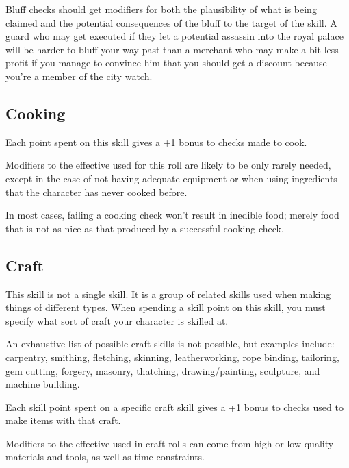 \begin{multicols*}{2}
Bluff checks should get modifiers for both the plausibility of what is being claimed and the potential consequences of the bluff to the target of the skill. A guard who may get executed if they let a potential assassin into the royal palace will be harder to bluff your way past than a merchant who may make a bit less profit if you manage to convince him that you should get a discount because you’re a member of the city watch.


\subsection{Cooking}\label{skill:Cooking}
Each point spent on this skill gives a +1 bonus to  checks made to cook.

Modifiers to the effective  used for this roll are likely to be only rarely needed, except in the case of not having adequate equipment or when using ingredients that the character has never cooked before.

In most cases, failing a cooking check won’t result in inedible food; merely food that is not as nice as that produced by a successful cooking check.

\subsection{Craft}\label{skill:Craft}
This skill is not a single skill. It is a group of related skills used when making things of different types. When spending a skill point on this skill, you must specify what sort of craft your character is skilled at.

An exhaustive list of possible craft skills is not possible, but examples include: carpentry, smithing, fletching, skinning, leatherworking, rope binding, tailoring, gem cutting, forgery, masonry, thatching, drawing/painting, sculpture, and machine building.

Each skill point spent on a specific craft skill gives a +1 bonus to  checks used to make items with that craft.

Modifiers to the effective  used in craft rolls can come from high or low quality materials and tools, as well as time constraints.


\end{multicols*}
